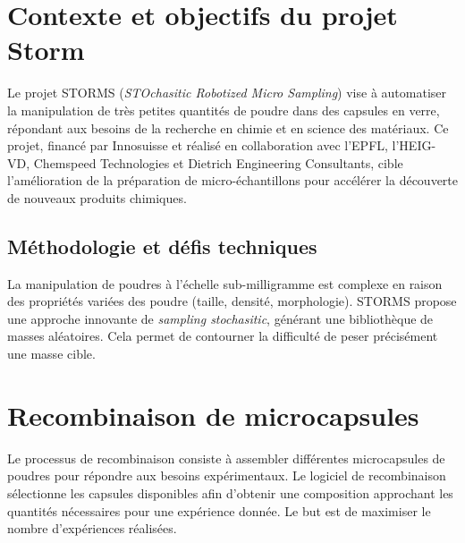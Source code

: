 
\section{Contexte et objectifs du projet Storm}
Le projet STORMS (\textit{STOchasitic Robotized Micro Sampling}) vise à automatiser la manipulation de très petites quantités de poudre dans des capsules en verre,
répondant aux besoins de la recherche en chimie et en science des matériaux. Ce projet, financé par Innosuisse et réalisé en collaboration avec l'EPFL, l'HEIG-VD, Chemspeed Technologies
et Dietrich Engineering Consultants, cible l'amélioration de la préparation de micro-échantillons pour accélérer la découverte de nouveaux produits chimiques.
\subsection{Méthodologie et défis techniques}
La manipulation de poudres à l'échelle sub-milligramme est complexe en raison des propriétés variées des poudre (taille, densité, morphologie). STORMS propose une approche innovante
de \og{}\textit{sampling stochasitic}\fg{}, générant une bibliothèque de masses aléatoires. Cela permet de contourner la difficulté de peser précisément une masse cible.

\section{Recombinaison de microcapsules}
Le processus de recombinaison consiste à assembler différentes microcapsules de poudres pour répondre aux besoins expérimentaux. Le logiciel de recombinaison sélectionne les capsules
disponibles afin d'obtenir une composition approchant les quantités nécessaires pour une expérience donnée. Le but est de maximiser le nombre d'expériences réalisées.